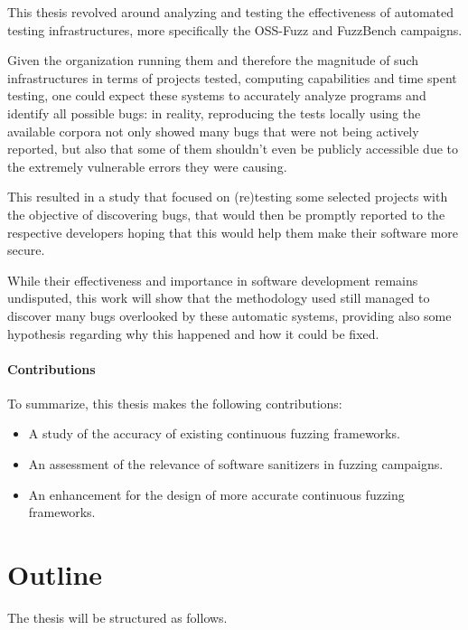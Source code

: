 
This thesis revolved around analyzing and testing the effectiveness of automated testing infrastructures, more specifically the OSS-Fuzz and FuzzBench campaigns.

Given the organization running them and therefore the magnitude of such infrastructures in terms of projects tested, computing capabilities and time spent testing, one could expect these systems to accurately analyze programs and identify all possible bugs: in reality, reproducing the tests locally using the available corpora not only showed many bugs that were not being actively reported, but also that some of them shouldn't even be publicly accessible due to the extremely vulnerable errors they were causing.

This resulted in a study that focused on (re)testing some selected projects with the objective of discovering bugs, that would then be promptly reported to the respective developers hoping that this would help them make their software more secure. 

While their effectiveness and importance in software development remains undisputed, this work will show that the methodology used still managed to discover many bugs overlooked by these automatic systems, providing also some hypothesis regarding why this happened and how it could be fixed.

\paragraph{Contributions}

To summarize, this thesis makes the following contributions:
\begin{itemize}
    \item A study of the accuracy of existing continuous fuzzing frameworks.
    \item An assessment of the relevance of software sanitizers in fuzzing campaigns.
    \item An enhancement for the design of more accurate continuous fuzzing frameworks.
\end{itemize}


\section{Outline}
The thesis will be structured as follows.

